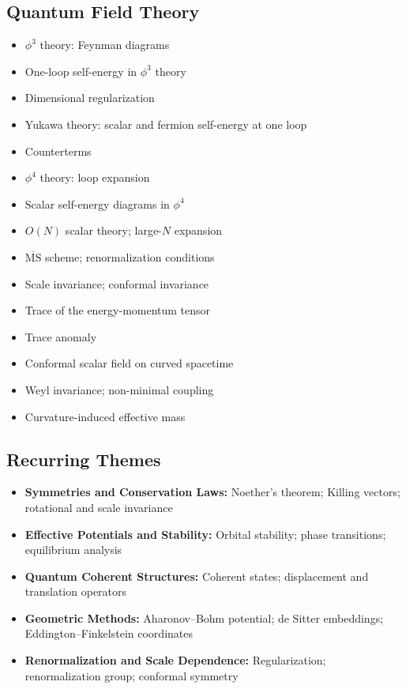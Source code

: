 \documentclass{amsart}
\begin{document}
\subsection{Quantum Field Theory}

\begin{itemize}
  \item $\phi^3$ theory: Feynman diagrams
  \item One-loop self-energy in $\phi^3$ theory
  \item Dimensional regularization
  \item Yukawa theory: scalar and fermion self-energy at one loop
  \item Counterterms
  \item $\phi^4$ theory: loop expansion
  \item Scalar self-energy diagrams in $\phi^4$
  \item $O(N)$ scalar theory; large-$N$ expansion
  \item $\overline{\mathrm{MS}}$ scheme; renormalization conditions
  \item Scale invariance; conformal invariance
  \item Trace of the energy-momentum tensor
  \item Trace anomaly
  \item Conformal scalar field on curved spacetime
  \item Weyl invariance; non-minimal coupling
  \item Curvature-induced effective mass
\end{itemize}

\subsection{Recurring Themes}

\begin{itemize}
  \item \textbf{Symmetries and Conservation Laws:} Noether's theorem; Killing vectors; rotational and scale invariance
  \item \textbf{Effective Potentials and Stability:} Orbital stability; phase transitions; equilibrium analysis
  \item \textbf{Quantum Coherent Structures:} Coherent states; displacement and translation operators
  \item \textbf{Geometric Methods:} Aharonov--Bohm potential; de Sitter embeddings; Eddington--Finkelstein coordinates
  \item \textbf{Renormalization and Scale Dependence:} Regularization; renormalization group; conformal symmetry
\end{itemize}
\end{document}
